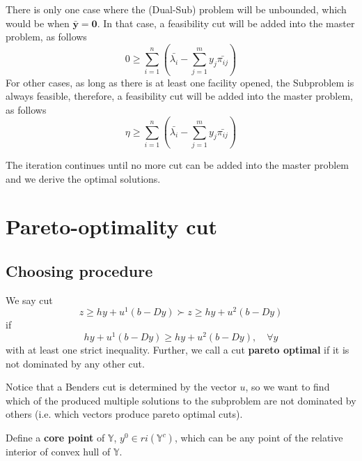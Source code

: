             There is only one case where the (Dual-Sub) problem will be unbounded, which would be when $\bar{\mathbf{y}} = \mathbf{0}$. In that case, a feasibility cut will be added into the master problem, as follows
            \begin{equation}
                0 \ge \sum_{i=1}^n (\bar{\lambda_i} - \sum_{j = 1}^m y_j \bar{\pi_{ij}})
            \end{equation}
            For other cases, as long as there is at least one facility opened, the Subproblem is always feasible, therefore, a feasibility cut will be added into the master problem, as follows
            \begin{equation*}
                \eta \ge \sum_{i=1}^n (\bar{\lambda_i} - \sum_{j = 1}^m y_j \bar{\pi_{ij}})
            \end{equation*}

            The iteration continues until no more cut can be added into the master problem and we derive the optimal solutions.

    \section{Pareto-optimality cut}
        \subsection{Choosing procedure}
            \begin{definition}
                We say cut
                \begin{equation}
                    z \ge hy + u^1(b - Dy) \succ z \ge hy + u^2(b - Dy)
                \end{equation}
                if
                \begin{equation}
                    hy + u^1(b - Dy) \ge hy + u^2(b - Dy), \quad \forall y    
                \end{equation}
                with at least one strict inequality. Further, we call a cut \textbf{pareto optimal} if it is not dominated by any other cut.
            \end{definition}

            Notice that a Benders cut is determined by the vector $u$, so we want to find which of the produced multiple solutions to the subproblem are not dominated by others (i.e. which vectors produce pareto optimal cuts).

            Define a \textbf{core point} of $\mathbb{Y}$, $y^0 \in ri(\mathbb{Y}^c)$, which can be any point of the relative interior of convex hull of $\mathbb{Y}$.

